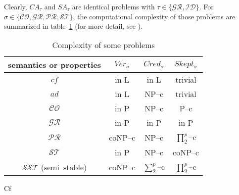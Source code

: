 Clearly, 
$CA_\tau$ and $SA_\tau$ are identical problems with $\tau \in \{\mathcal{GR},\mathcal{ID}\}$.
% 
For $\sigma \in \{\mathcal{CO,GR,PR,ST}\}$, 
the computational complexity of those problems are summarized in  table~\ref{tab: complexity} (for more detail, see \cite{Dun.Woo2009,Dvo.Dun2018}).




\begin{table}[th!]
    \centering
    \caption{Complexity of some problems}
    \label{tab: complexity}
    \renewcommand{\arraystretch}{1.5}
    \begin{tabular}{c||ccc}
    \hline

    semantics or properties & 
    $Ver_\sigma$ & $Cred_\sigma$ & $Skept_\sigma$   \\
    \hline

    $cf$ & 
    in \textsf{L} & 
    in \textsf{L} & 
    trivial \\

    $ad$ & 
    in \textsf{L} & 
    \textsf{NP--c} & 
    trivial \\

    \hline

    $\mathcal{CO}$ & 
    in \textsf{P} & 
    \textsf{NP--c} & 
    \textsf{P--c}  \\

    $\mathcal{GR}$ & 
    in \textsf{P} & 
    in \textsf{P} & 
    in \textsf{P}  \\

    $\mathcal{PR}$ & 
    \textsf{coNP--c} & 
    \textsf{NP--c} & 
    \textsf{$\prod^p_2$--c}  \\

    $\mathcal{ST}$ & 
    in \textsf{P} & 
    \textsf{NP--c} & 
    \textsf{coNP--c} \\
    
    \hline 

    $\mathcal{SST}$ (semi--stable) & 
    \textsf{coNP--c} & 
    \textsf{$\sum^p_2$--c} & 
    \textsf{$\prod^p_2$--c}  \\

    \hline
\end{tabular}

\vspace*{1em}
\parbox{10cm}{\footnotesize
Cf \cite[Table 1]{Dvo.Dun2018}
}
\end{table}





\vspace*{3em}


